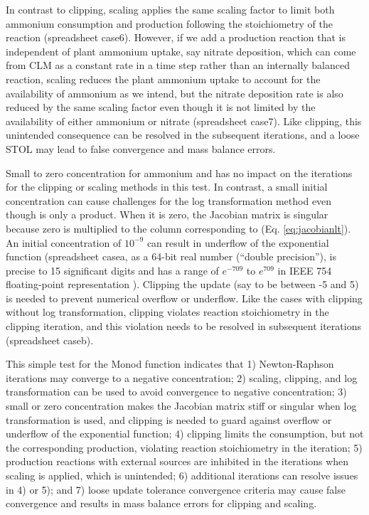\documentclass[gmd, manuscript]{copernicus}
\begin{document}
In contrast to clipping, scaling applies the same scaling factor to limit both
ammonium consumption and  production following the stoichiometry
of the reaction (spreadsheet case6). However, if we add a production reaction that is
independent of plant ammonium uptake, say nitrate deposition, which can come
from CLM as a constant rate in a time step rather than an internally balanced
reaction, scaling reduces the plant ammonium uptake to account for the
availability of ammonium as we intend, but the nitrate deposition rate is also
reduced by the same scaling factor even though it is not limited by the
availability of either ammonium or nitrate (spreadsheet case7). Like clipping, this
unintended consequence can be resolved in the subsequent iterations, and a
loose STOL may lead to false convergence and mass balance errors.

Small to zero concentration for ammonium and  has no impact on the
iterations for the clipping or scaling methods in this test. In contrast, a
small initial  concentration can cause challenges for the log
transformation method even though  is only a product. When it is zero,
the Jacobian matrix is singular because zero is multiplied to the column
corresponding to  (Eq. \ref{eq:jacobianlt}). An initial
 concentration of $10^{-9}$ can result in underflow of the
exponential function (spreadsheet casea, as a 64-bit real number (``double precision''), is precise to 15 significant digits and has a range of
$e^{-709}$ to $e^{709}$ in IEEE 754 floating-point representation \citep{Lemmon2005}).
Clipping the update (say to be between -5 and 5) is needed to prevent numerical
overflow or underflow. Like the cases with clipping without log transformation,
clipping violates reaction stoichiometry in the clipping iteration, and this
violation needs to be resolved in subsequent iterations (spreadsheet caseb).

This simple test for the Monod function indicates that 
1) Newton-Raphson iterations may converge to a negative concentration; 
2) scaling, clipping, and log transformation can be used to avoid convergence
to negative concentration; 
3) small or zero concentration makes the Jacobian matrix stiff or singular when
log transformation is used, and clipping is needed to guard against overflow or
underflow of the exponential function; 
4) clipping limits the consumption, but not the corresponding production,
violating reaction stoichiometry in the iteration; 
5) production reactions with external sources are inhibited in the iterations
when scaling is applied, which is unintended; 
6) additional iterations can resolve issues in 4) or 5); and
7) loose update tolerance convergence criteria may cause false convergence and
results in mass balance errors for clipping and scaling.
\end{document}
